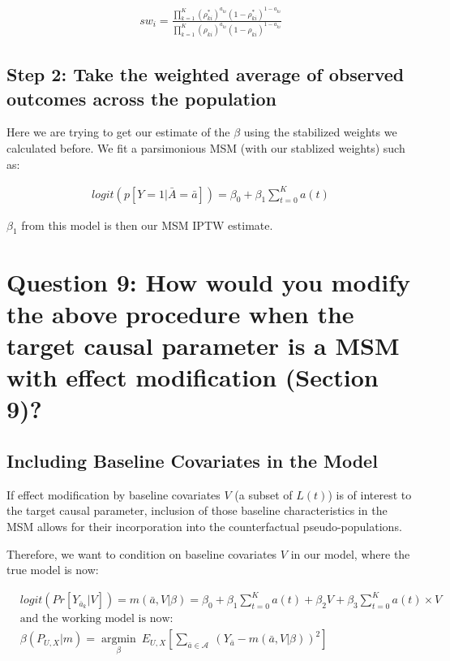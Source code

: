 \documentclass[]{article}
\begin{document}
\begin{align*}
sw_i = \frac{\prod_{k=1}^K(\rho_{ki}^*)^{a_{ki}}(1-\rho_{ki}^*)^{1-a_{ki}}}{\prod_{k=1}^K(\rho_{ki})^{a_{ki}}(1-\rho_{ki})^{1-a_{ki}}}
\end{align*}

\subsection{Step 2: Take the weighted average of observed outcomes
across the
population}\label{step-2-take-the-weighted-average-of-observed-outcomes-across-the-population}

Here we are trying to get our estimate of the \(\beta\) using the
stabilized weights we calculated before. We fit a parsimonious MSM (with
our stablized weights) such as:

\begin{align*}
logit (p[Y=1 | \bar{A} = \bar{a}]) = \beta_0 +\beta_1\sum_{t=0}^Ka(t)
\end{align*}

\(\beta_1\) from this model is then our MSM IPTW estimate.

\section{Question 9: How would you modify the above procedure when the
target causal parameter is a MSM with effect modification (Section
9)?}\label{question-9-how-would-you-modify-the-above-procedure-when-the-target-causal-parameter-is-a-msm-with-effect-modification-section-9}

\subsection{Including Baseline Covariates in the
Model}\label{including-baseline-covariates-in-the-model}

\vspace{3mm} If effect modification by baseline covariates \(V\) (a
subset of \(L(t)\)) is of interest to the target causal parameter,
inclusion of those baseline characteristics in the MSM allows for their
incorporation into the counterfactual pseudo-populations.

\vspace{3mm} Therefore, we want to condition on baseline covariates
\(V\) in our model, where the true model is now: \vspace{-6mm}
\fontsize{10}{20}

\begin{align*}
&logit(Pr[Y_{\bar{a}_k}|V]) = m(\bar{a},V|\beta) = \beta_0 + \beta_1\sum_{t=0}^Ka(t) + \beta_2V + \beta_3\sum_{t=0}^Ka(t) \times V \\
&\text{and the working model is now:} \\
&\beta(P_{U,X}|m) = \underset{\beta}{\operatorname{argmin}} \ E_{U,X}[\sum_{\bar{a} \in \mathcal{A}} \ (Y_{\bar{a}} - m(\bar{a}, V |\beta))^2] \\
\end{align*}
\end{document}
